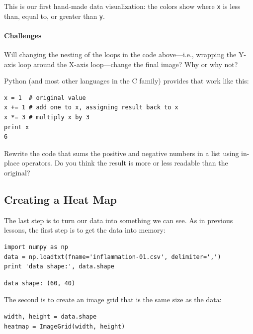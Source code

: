 \documentclass{book}
\begin{document}
This is our first hand-made data visualization: the colors show where
\texttt{x} is less than, equal to, or greater than \texttt{y}.

\mbox{}\paragraph{Challenges}

\begin{swcenumerate}
\item
  Will changing the nesting of the loops in the code above---i.e.,
  wrapping the Y-axis loop around the X-axis loop---change the final
  image? Why or why not?
\item
  Python (and most other languages in the C family) provides
   that work like
  this:

\begin{verbatim}
x = 1  # original value
x += 1 # add one to x, assigning result back to x
x *= 3 # multiply x by 3
print x
6
\end{verbatim}

  Rewrite the code that sums the positive and negative numbers in a list
  using in-place operators. Do you think the result is more or less
  readable than the original?
\end{swcenumerate}

\subsection{Creating a Heat Map}

The last step is to turn our data into something we can see. As in
previous lessons, the first step is to get the data into memory:

\begin{verbatim}
import numpy as np
data = np.loadtxt(fname='inflammation-01.csv', delimiter=',')
print 'data shape:', data.shape
\end{verbatim}

\begin{verbatim}
data shape: (60, 40)
\end{verbatim}

The second is to create an image grid that is the same size as the data:

\begin{verbatim}
width, height = data.shape
heatmap = ImageGrid(width, height)
\end{verbatim}
\end{document}
